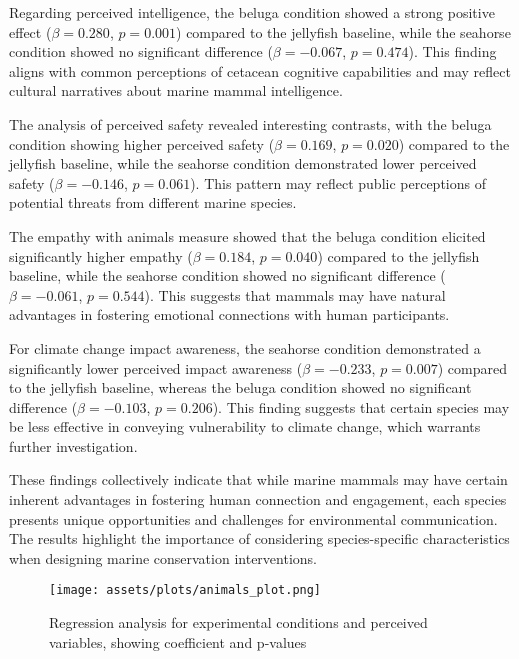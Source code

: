 \documentclass[sigconf, nonacm]{acmart}
\begin{document}
Regarding perceived intelligence, the beluga condition showed a strong positive effect ($\beta = 0.280$, $p = 0.001$) compared to the jellyfish baseline, while the seahorse condition showed no significant difference ($\beta = -0.067$, $p = 0.474$). This finding aligns with common perceptions of cetacean cognitive capabilities and may reflect cultural narratives about marine mammal intelligence.

The analysis of perceived safety revealed interesting contrasts, with the beluga condition showing higher perceived safety ($\beta = 0.169$, $p = 0.020$) compared to the jellyfish baseline, while the seahorse condition demonstrated lower perceived safety ($\beta = -0.146$, $p = 0.061$). This pattern may reflect public perceptions of potential threats from different marine species.

The empathy with animals measure showed that the beluga condition elicited significantly higher empathy ($\beta = 0.184$, $p = 0.040$) compared to the jellyfish baseline, while the seahorse condition showed no significant difference ($\beta = -0.061$, $p = 0.544$). This suggests that mammals may have natural advantages in fostering emotional connections with human participants.

For climate change impact awareness, the seahorse condition demonstrated a significantly lower perceived impact awareness ($\beta = -0.233$, $p = 0.007$) compared to the jellyfish baseline, whereas the beluga condition showed no significant difference ($\beta = -0.103$, $p = 0.206$). This finding suggests that certain species may be less effective in conveying vulnerability to climate change, which warrants further investigation.

These findings collectively indicate that while marine mammals may have certain inherent advantages in fostering human connection and engagement, each species presents unique opportunities and challenges for environmental communication. The results highlight the importance of considering species-specific characteristics when designing marine conservation interventions.

\begin{figure}
    \centering
    \texttt{[image: assets/plots/animals\_plot.png]}
    \caption{Regression analysis for experimental conditions and perceived variables, showing coefficient and p-values}
    \label{fig:conditions}
\end{figure}
\end{document}
